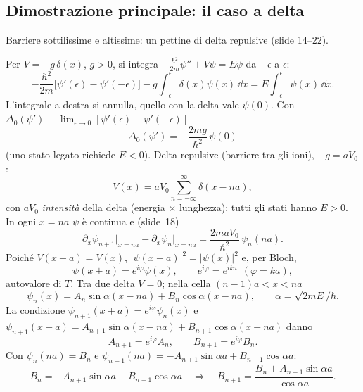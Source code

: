 \documentclass[11pt,a4paper]{article}
\begin{document}
\subsection{Dimostrazione principale: il caso a delta}\label{sec:delta}
Barriere sottilissime e altissime: un pettine di delta repulsive (slide 14--22).
\begin{dimostrazione}
Per $V=-g\,\delta(x)$, $g>0$, si integra $-\frac{\hbar^2}{2m}\psi''+V\psi=E\psi$ da $-\epsilon$ a $\epsilon$:
\[
-\frac{\hbar^2}{2m}\bigl[\psi'(\epsilon)-\psi'(-\epsilon)\bigr]-g\int_{-\epsilon}^{\epsilon}\!\delta(x)\psi(x)\,\dd x=E\int_{-\epsilon}^{\epsilon}\!\psi(x)\,\dd x .
\]
L'integrale a destra si annulla, quello con la delta vale $\psi(0)$. Con $\Delta_0(\psi')\equiv\lim_{\epsilon\to0}[\psi'(\epsilon)-\psi'(-\epsilon)]$
\[
\Delta_0(\psi')=-\frac{2mg}{\hbar^2}\,\psi(0)
\]
(uno stato legato richiede $E<0$).
Delta repulsive (barriere tra gli ioni), $-g=aV_0$:
\[
V(x)=aV_0\sum_{n=-\infty}^{\infty}\delta(x-na),
\]
con $aV_0$ \emph{intensità} della delta (energia $\times$ lunghezza); tutti gli stati hanno $E>0$. In ogni $x=na$ $\psi$ è continua e (slide~18)
\[
\partial_x\psi_{n+1}\big|_{x=na}-\partial_x\psi_n\big|_{x=na}=\frac{2maV_0}{\hbar^2}\,\psi_n(na).
\]
Poiché $V(x+a)=V(x)$, $|\psi(x+a)|^2=|\psi(x)|^2$ e, per Bloch,
\[
\psi(x+a)=e^{i\varphi}\psi(x),\qquad e^{i\varphi}=e^{ika}\ \ (\varphi=ka),
\]
autovalore di $T$.
Tra due delta $V=0$; nella cella $(n-1)a<x<na$
\begin{equation}\label{eq:kpcella}
\psi_n(x)=A_n\sin\alpha(x-na)+B_n\cos\alpha(x-na),\qquad \alpha=\sqrt{2mE}/\hbar.
\end{equation}
La condizione $\psi_{n+1}(x+a)=e^{i\varphi}\psi_n(x)$ e $\psi_{n+1}(x+a)=A_{n+1}\sin\alpha(x-na)+B_{n+1}\cos\alpha(x-na)$ danno
\begin{equation}\label{eq:kpbloch}
A_{n+1}=e^{i\varphi}A_n,\qquad B_{n+1}=e^{i\varphi}B_n.
\end{equation}
Con $\psi_n(na)=B_n$ e $\psi_{n+1}(na)=-A_{n+1}\sin\alpha a+B_{n+1}\cos\alpha a$:
\[
B_n=-A_{n+1}\sin\alpha a+B_{n+1}\cos\alpha a\quad\Longrightarrow\quad B_{n+1}=\frac{B_n+A_{n+1}\sin\alpha a}{\cos\alpha a}.
\]
\end{dimostrazione}
\end{document}
